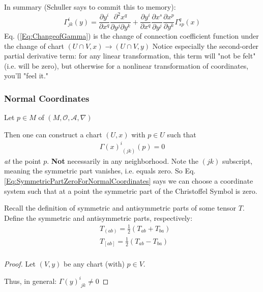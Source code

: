 \documentclass[10pt]{amsart}
\begin{document}
\begin{multicols*}{2}
In summary (Schuller says to commit this to memory):
\begin{equation}\label{Eq:ChangeofGamma}
	\boxed{ \Gamma^i_{jk}(y) = \frac{ \partial y^i}{ \partial x^q} \frac{ \partial^2 x^q}{ \partial y^j \partial y^k} + \frac{ \partial y^i}{ \partial x^q } \frac{ \partial x^s }{ \partial y^j} \frac{ \partial x^p }{ \partial y^k} \Gamma^q_{sp}(x) }
\end{equation}
Eq. (\ref{Eq:ChangeofGamma}) is the change of connection coefficient function under the change of chart $(U\cap V,x) \to (U\cap V,y)$ Notice especially the second-order partial derivative term: for any linear transformation, this term will "not be felt" (i.e. will be zero), but otherwise for a nonlinear transformation of coordinates, you'll "feel it."


\subsubsection{Normal Coordinates}

Let $p \in M$ of $(M, \mathcal{O}, \mathcal{A}, \nabla)$

Then one can construct a chart $(U,x)$ with $p\in U$ such that 
\begin{equation}\label{Eq:SymmetricPartZeroForNormalCoordinates}
\begin{gathered}
	\Gamma(x)^i_{\,\, (jk)}(p) = 0
\end{gathered} 
\end{equation}
\emph{at} the point $p$. \textbf{Not} necessarily in any neighborhood. Note the $(jk)$ subscript, meaning the symmetric part vanishes, i.e. equals zero. So Eq. \ref{Eq:SymmetricPartZeroForNormalCoordinates} says we can choose a coordinate system such that at a point the symmetric part of the Christoffel Symbol is zero.

Recall the definition of symmetric and antisymmetric parts of some tensor $T$. Define the symmetric and antisymmetric parts, respectively:
\[
\begin{aligned}
	& T_{(ab)} = \frac{1}{2} ( T_{ab} + T_{ba}) \\
	& T_{[ab]} = \frac{1}{2} ( T_{ab} - T_{ba}) \\
\end{aligned}
\]

\begin{proof}
	Let $(V,y)$ be any chart (with) $p\in V$.
	
	Thus, in general: $\Gamma(y)^i_{\,\, jk} \neq 0$
	

\end{proof}
\end{multicols*}
\end{document}
